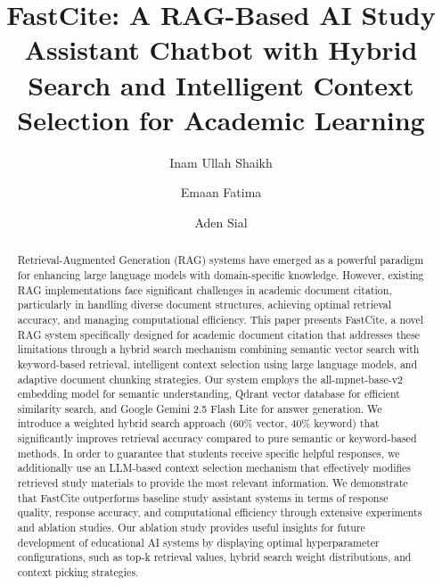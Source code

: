 \documentclass[runningheads]{llncs}
\begin{document}
%
\title{FastCite: A RAG-Based AI Study Assistant Chatbot with Hybrid Search and Intelligent Context Selection for Academic Learning}
%
%
\author{Inam Ullah Shaikh \and
Emaan Fatima \and
Aden Sial}
%
%
%
\maketitle
%
\begin{abstract}
Retrieval-Augmented Generation (RAG) systems have emerged as a powerful paradigm for enhancing large language models with domain-specific knowledge. However, existing RAG implementations face significant challenges in academic document citation, particularly in handling diverse document structures, achieving optimal retrieval accuracy, and managing computational efficiency. This paper presents FastCite, a novel RAG system specifically designed for academic document citation that addresses these limitations through a hybrid search mechanism combining semantic vector search with keyword-based retrieval, intelligent context selection using large language models, and adaptive document chunking strategies. Our system employs the all-mpnet-base-v2 embedding model for semantic understanding, Qdrant vector database for efficient similarity search, and Google Gemini 2.5 Flash Lite for answer generation. We introduce a weighted hybrid search approach (60\% vector, 40\% keyword) that significantly improves retrieval accuracy compared to pure semantic or keyword-based methods. In order to guarantee that students receive specific helpful responses, we additionally use an LLM-based context selection mechanism that effectively modifies retrieved study materials to provide the most relevant information. We demonstrate that FastCite outperforms baseline study assistant systems in terms of response quality, response accuracy, and computational efficiency through extensive experiments and ablation studies. Our ablation study provides useful insights for future development of educational AI systems by displaying optimal hyperparameter configurations, such as top-k retrieval values, hybrid search weight distributions, and context picking strategies.
\end{abstract}
%
%
%
\end{document}
